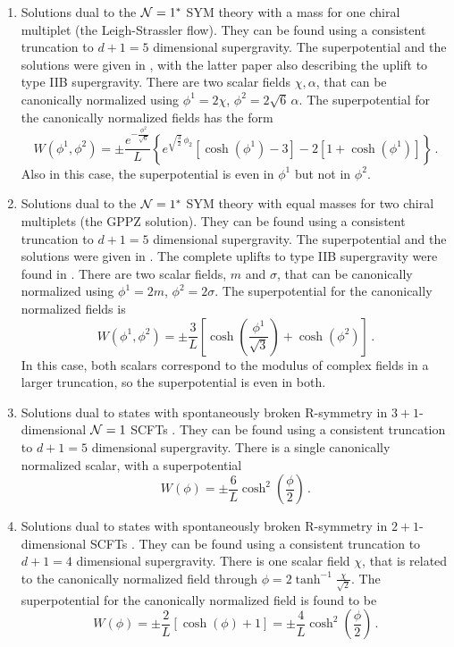 \begin{enumerate}
\item Solutions dual to the $\mathcal{N}=1^*$ SYM theory with a mass for one chiral multiplet (the Leigh-Strassler flow).
They can be found using a consistent truncation to $d+1=5$ dimensional supergravity.
The superpotential and the solutions were given in \cite{Freedman:1999gp,Pilch:2000fu}, with the latter paper also describing the uplift to type IIB supergravity.
There are two scalar fields $\chi,\alpha$, that can be canonically normalized using $\phi^1=2\chi$, $\phi^2 =2\sqrt{6}\,\alpha$.
The superpotential for the canonically normalized fields has the form
\begin{equation}
	W(\phi^1,\phi^2)= \pm\frac{e^{-\frac{\phi^2}{\sqrt{6}}}}{L}\left\{e^{\sqrt{\frac{3}{2}}\,\phi_2}\left[\cosh\left(\phi^1\right)-3 \right] - 2\left[1 + \cosh\left(\phi^1\right)\right]\right\}\,.
\end{equation}
Also in this case, the superpotential is even in $\phi^1$ but not in $\phi^2$. 

\item Solutions dual to the $\mathcal{N}=1^*$ SYM theory with equal masses for two chiral multiplets (the GPPZ solution).
They can be found using a consistent truncation to $d+1=5$ dimensional supergravity.
The superpotential and the solutions were given in \cite{Girardello:1999bd}.
The complete uplifts to type IIB supergravity were found in \cite{Bobev:2018eer,Petrini:2018pjk}.
There are two scalar fields, $m$ and $\sigma$, that can be canonically normalized using $\phi^1= 2m$, $\phi^2 = 2\sigma$.
The superpotential for the canonically normalized fields is
\begin{equation}
	W(\phi^1,\phi^2) = \pm \frac{3}{L}\left[\cosh\left({\frac{\phi^1}{\sqrt{3}}}\right)+\cosh\left({\phi^2}\right)\right]\,.
\end{equation}
In this case, both scalars correspond to the modulus of complex fields in a larger truncation, so the superpotential is even in both. 

\item Solutions dual to states with spontaneously broken R-symmetry in $3+1$-dimensional $\mathcal{N}=1$ SCFTs \cite{Gubser:2009qm}.
They can be found using a consistent truncation to $d+1=5$ dimensional supergravity.
There is a single canonically normalized scalar, with a superpotential \cite{Cassani:2010uw,Gauntlett:2010vu}
\begin{equation}
	W(\phi)= \pm \frac{6}{L}\cosh^2\left(\frac{\phi}{2}\right)\,.
\end{equation}
\item Solutions dual to states with spontaneously broken R-symmetry in $2+1$-dimensional SCFTs \cite{Gauntlett:2009dn}.
They can be found using a consistent truncation to $d+1=4$ dimensional supergravity.
There is one scalar field $\chi$, that is related to the canonically normalized field through $\phi=2\tanh^{-1}\frac{\chi}{\sqrt{2}}$.
The superpotential for the canonically normalized field is found to be
\begin{equation}
	W(\phi)= \pm \frac{2}{L}\left[\cosh\left(\phi\right)+1\right]=\pm \frac{4}{L}\cosh^2\left(\frac{\phi}{2}\right)\,.
\end{equation}


\end{enumerate}
